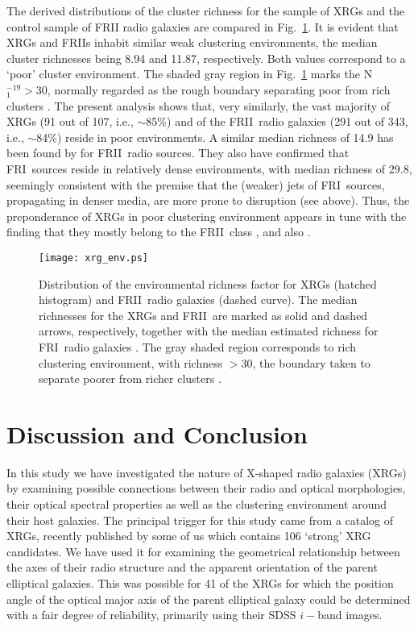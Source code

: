 \documentclass[twocolumn]{aastex62}
\def\frii{FR{II}~}
\def\fri{FR{I}}
\begin{document}
 The derived distributions of the cluster richness for the sample of
 XRGs and the control sample of FRII radio galaxies are compared in
 Fig.~\ref{fig:xrg_env}. It is evident that XRGs and FRIIs inhabit
 similar weak clustering environments, the median cluster
 richnesses being 8.94 and 11.87, respectively. Both values correspond
 to a `poor' cluster environment. The shaded gray region in
 Fig.~\ref{fig:xrg_env} marks the N${^{- 19}_{1}} > 30$, normally
 regarded as the rough boundary separating poor from rich clusters
 \citep{Gendre2013MNRAS.430.3086G}. The present analysis
 shows that, very similarly, the vast majority of XRGs (91 out of 107,
 i.e., $\sim$85\%) and of the \frii radio galaxies (291 out of 343,
 i.e., $\sim$84\%) reside in poor environments. A similar median
 richness of 14.9  has been found by \citet{Gendre2013MNRAS.430.3086G} 
 for \frii radio sources. They also have confirmed that \fri\ sources 
 reside in relatively dense environments, with median richness of 29.8, 
 seemingly consistent with the premise that the (weaker) jets of \fri\ 
 sources, propagating in denser media, are more prone to disruption
 (see above). Thus, the preponderance of XRGs in poor clustering 
 environment appears in tune with the finding that they mostly belong 
 to the \frii class \citep[see section 5 of][]{Saripalli2009ApJ...695..156S}, and also
 \citet{Kuzmicz2019A&A...624A..91K}.
 

 \begin{figure}
\texttt{[image: xrg\_env.ps]}
  \caption{ Distribution of the environmental richness factor for XRGs 
  (hatched histogram) and \frii radio galaxies (dashed curve). The median
  richnesses for the XRGs and \frii are marked as solid and dashed arrows, 
  respectively, together with the median estimated richness for \fri\ radio 
  galaxies \citep{Gendre2013MNRAS.430.3086G}. The gray shaded region 
  corresponds to rich clustering environment, with richness $> 30$, the 
  boundary  taken to separate poorer from richer clusters \citep{Gendre2013MNRAS.430.3086G}.}
\label{fig:xrg_env}
 \end{figure}


\section{Discussion and Conclusion}
\label{sec:dis}
In this study we have investigated the nature of X-shaped radio
galaxies (XRGs) by examining possible connections between their radio
and optical morphologies, their optical spectral properties as well as the
clustering environment around their host galaxies. The principal
trigger for this study came from a catalog of XRGs, recently published
by some of us \citep{Yang2019arXiv190506356Y} which contains 106
`strong' XRG candidates. We have used it for examining the geometrical
relationship between the axes of their radio structure and the
apparent orientation of the parent elliptical galaxies. This was
possible for 41 of the XRGs for which the position angle of the
optical major axis of the parent elliptical galaxy could be determined 
with a fair degree of reliability, primarily using their SDSS $i-$band 
images. 
\end{document}
